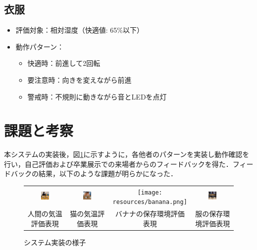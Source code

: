 \documentclass{cuxarticle}
\begin{document}
\subsection{衣服}
\begin{itemize}
  \item 評価対象：相対湿度（快適値: 65\%以下）\cite{--クローゼ}
  \item 動作パターン：
    \begin{itemize}
      \item 快適時：前進して2回転
      \item 要注意時：向きを変えながら前進
      \item 警戒時：不規則に動きながら音とLEDを点灯
    \end{itemize}
\end{itemize}

\section{課題と考察}
本システムの実装後，図\ref{fig:system-test}に示すように，各他者のパターンを実装し動作確認を行い，自己評価および卒業展示での来場者からのフィードバックを得た．フィードバックの結果，以下のような課題が明らかになった．

\begin{figure}[h]
  \centering
  \begin{tabular}{cccc}
    \includegraphics[width=0.22\textwidth]{resources/human.png} &
    \includegraphics[width=0.22\textwidth]{resources/cat.png} &
    \texttt{[image: resources/banana.png]} &
    \includegraphics[width=0.22\textwidth]{resources/clothes.png} \\
    人間の気温評価表現 & 猫の気温評価表現 & バナナの保存環境評価表現 & 服の保存環境評価表現
  \end{tabular}
  \caption{システム実装の様子}
  \label{fig:system-test}
\end{figure}
\end{document}
